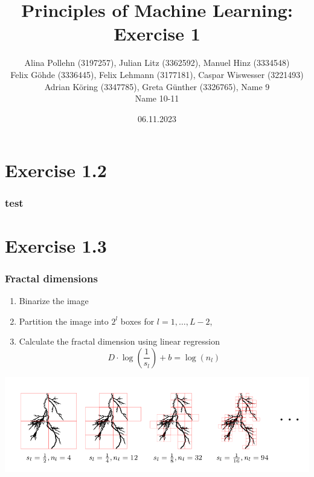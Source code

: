 \documentclass[10pt,aspectratio=169,handout]{beamer}
\begin{document}
\title{Principles of Machine Learning: Exercise 1}
\date{06.11.2023}
\author{Alina Pollehn (3197257), Julian Litz (3362592), Manuel Hinz (3334548)\\Felix Göhde (3336445), Felix Lehmann (3177181), Caspar Wiswesser (3221493) \\Adrian Köring (3347785), Greta Günther (3326765), Name 9\\ Name 10-11}

\begin{frame}
    \maketitle
\end{frame}

\section{Exercise 1.2}

\begin{frame}
    \frametitle{test}
\end{frame}


\section{Exercise 1.3}

\begin{frame}
    \frametitle{Fractal dimensions}

    \begin{enumerate}
        \item Binarize the image
        \item Partition the image into $2^l$ boxes for $l=1,\dots,L-2$,
        \item Calculate the fractal dimension using linear regression \[D\cdot \log\left(\frac{1}{s_l}\right)+b=\log(n_l)\] 
    \end{enumerate}    
    \includegraphics[scale=0.4]{images/boxes.png}

\end{frame}
\end{document}
